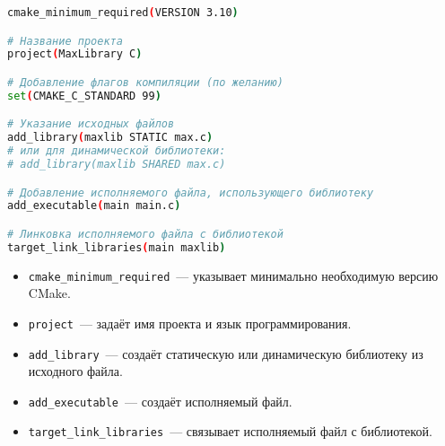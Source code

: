 \begin{lstlisting}[language=bash,caption={Пример структуры CMakeLists.txt}]
cmake_minimum_required(VERSION 3.10)

# Название проекта
project(MaxLibrary C)

# Добавление флагов компиляции (по желанию)
set(CMAKE_C_STANDARD 99)

# Указание исходных файлов
add_library(maxlib STATIC max.c)
# или для динамической библиотеки:
# add_library(maxlib SHARED max.c)

# Добавление исполняемого файла, использующего библиотеку
add_executable(main main.c)

# Линковка исполняемого файла с библиотекой
target_link_libraries(main maxlib)
\end{lstlisting}

\begin{itemize}
  \item \texttt{cmake\_minimum\_required}~--- указывает минимально необходимую версию CMake.
  \item \texttt{project}~--- задаёт имя проекта и язык программирования.
  \item \texttt{add\_library}~--- создаёт статическую или динамическую библиотеку из исходного файла.
  \item \texttt{add\_executable}~--- создаёт исполняемый файл.
  \item \texttt{target\_link\_libraries}~--- связывает исполняемый файл с библиотекой.
\end{itemize}